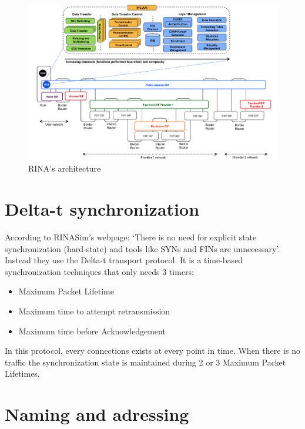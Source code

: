 \documentclass[a4paper]{proc}
\begin{document}
\begin{figure}
    \centering
    \includegraphics[width=\columnwidth]{arch.png}
    \caption{RINA's architecture}
    \label{fig:arch}
\end{figure}

\section{Delta-t synchronization}

According to RINASim's webpage: `There is no need for explicit state
synchronization (hard-state) and tools like SYNs and FINs are unnecessary'.
Instead they use the Delta-t transport protocol\cite{65288}.  It is a time-based
synchronization techniques that only needs 3 timers:

\begin{itemize}
    \item Maximum Packet Lifetime
    \item Maximum time to attempt retransmission
    \item Maximum time before Acknowledgement
\end{itemize}

In this protocol, every connections exists at every point in time.  When there
is no traffic the synchronization state is maintained during 2 or 3 Maximum
Packet Lifetimes.\cite{rinasim}

\section{Naming and adressing}
\end{document}
